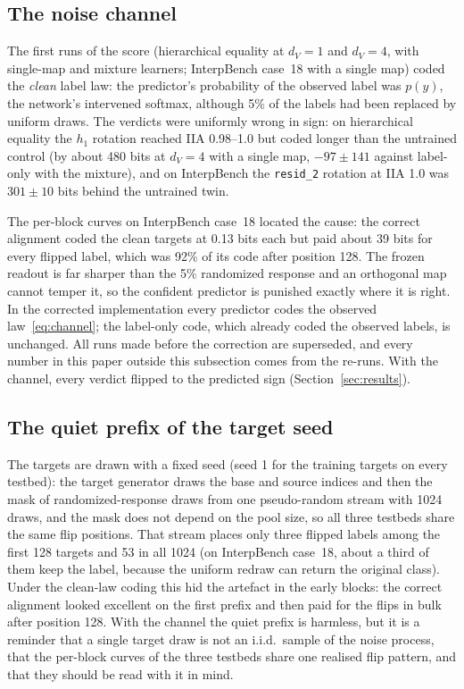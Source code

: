 \documentclass[11pt,a4paper]{article}
\newcommand{\dv}{d_V}
\begin{document}
\subsection{The noise channel}
\label{sec:channel}

The first runs of the score (hierarchical equality at $\dv=1$ and $\dv=4$, with single-map and mixture learners; InterpBench case~18 with a single map) coded the \emph{clean} label law: the predictor's probability of the observed label was $p(y)$, the network's intervened softmax, although 5\% of the labels had been replaced by uniform draws. The verdicts were uniformly wrong in sign: on hierarchical equality the $h_1$ rotation reached IIA 0.98--1.0 but coded longer than the untrained control (by about 480 bits at $\dv=4$ with a single map, $-97\pm141$ against label-only with the mixture), and on InterpBench the \texttt{resid\_2} rotation at IIA 1.0 was $301\pm10$ bits behind the untrained twin.

The per-block curves on InterpBench case~18 located the cause: the correct alignment coded the clean targets at 0.13 bits each but paid about 39 bits for every flipped label, which was 92\% of its code after position 128. The frozen readout is far sharper than the 5\% randomized response and an orthogonal map cannot temper it, so the confident predictor is punished exactly where it is right. In the corrected implementation every predictor codes the observed law~\eqref{eq:channel}; the label-only code, which already coded the observed labels, is unchanged. All runs made before the correction are superseded, and every number in this paper outside this subsection comes from the re-runs. With the channel, every verdict flipped to the predicted sign (Section~\ref{sec:results}).

\subsection{The quiet prefix of the target seed}
\label{sec:quietprefix}

The targets are drawn with a fixed seed (seed 1 for the training targets on every testbed): the target generator draws the base and source indices and then the mask of randomized-response draws from one pseudo-random stream with 1024 draws, and the mask does not depend on the pool size, so all three testbeds share the same flip positions. That stream places only three flipped labels among the first 128 targets and 53 in all 1024 (on InterpBench case~18, about a third of them keep the label, because the uniform redraw can return the original class). Under the clean-law coding this hid the artefact in the early blocks: the correct alignment looked excellent on the first prefix and then paid for the flips in bulk after position 128. With the channel the quiet prefix is harmless, but it is a reminder that a single target draw is not an i.i.d.\ sample of the noise process, that the per-block curves of the three testbeds share one realised flip pattern, and that they should be read with it in mind.
\end{document}

